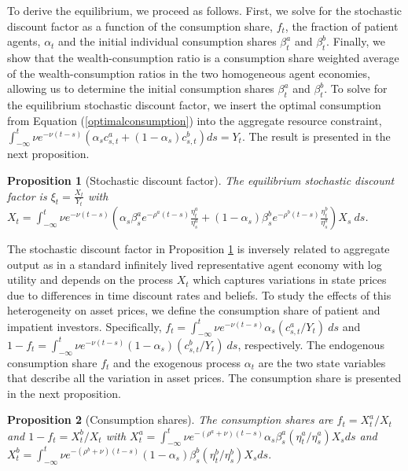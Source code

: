 \documentclass[preprint,11pt,authoryear]{elsarticle}
\theoremstyle{plain}
\newtheorem{prop}{Proposition}
\begin{document}
To derive the equilibrium, we proceed as follows. First, we solve for the stochastic discount factor as a function of the consumption share, $f_t$, the fraction of patient agents, $\alpha_t$ and the initial individual consumption shares $\beta^a_{t}$ and $\beta^b_{t}$. Finally, we show that the wealth-consumption ratio is a consumption share weighted average of the wealth-consumption ratios in the two homogeneous agent economies, allowing us to determine the initial consumption shares $\beta^a_{t}$ and $\beta^b_{t}$.  To solve for the  equilibrium stochastic discount factor, we insert the optimal consumption from Equation (\ref{optimalconsumption}) into the aggregate resource constraint, $\int_{-\infty}^{t} \nu e^{-\nu (t-s )} (\alpha_s c^a_{s,t}+(1-\alpha_s) c^b_{s,t}) ds =  Y_t$. The result is presented in the next proposition.
\begin{prop}[Stochastic discount factor]\label{SDF}
The equilibrium stochastic discount factor is $\xi_t = \frac{X_t}{Y_t}$ with $X_t =\int_{-\infty}^{t} \nu e^{-\nu \left(t-s\right)} \left(\alpha_s \beta^a_s e^{-\rho^a \left(t-s\right)}\frac{\eta^a_t}{\eta^a_s} +\left(1-\alpha_s\right)\beta^b_s e^{-\rho^b \left(t-s\right)} \frac{\eta^b_t}{\eta^b_s}\right)X_s \: ds$.
\end{prop}
The stochastic discount factor in Proposition \ref{SDF} is inversely related to aggregate output as in a standard infinitely lived representative agent economy with log utility and depends on the process $X_t$ which captures variations in state prices due to differences in time discount rates and beliefs. To study the effects of this heterogeneity on asset prices, we define the consumption share of patient and impatient investors. Specifically, $f_t  = \int_{-\infty}^t \nu  e^{-\nu(t-s)}  \alpha_s (c_{s,t}^a/Y_t) \: ds$ and $1-f_t  = \int_{-\infty}^t \nu  e^{-\nu(t-s)}  (1-\alpha_s) (c_{s,t}^b/ Y_t) \: ds$, respectively.  
The endogenous consumption share $f_t$ and the exogenous process $\alpha_t$ are the two state variables that describe all the variation in asset prices.  The consumption share is presented in the next proposition. 
\begin{prop}[Consumption shares]\label{prop:f}
The consumption shares are $f_t = X^a_t/X_t$ and $1-f_t = X^b_t/X_t$ with $X^a_t = \int_{-\infty}^{t} \nu e^{-\left(\rho^a + \nu\right)\left(t-s\right)}\alpha_s \beta^a_s (\eta^a_t/\eta^a_s)X_s ds$ and $X^b_t = \int_{-\infty}^{t} \nu e^{-\left(\rho^b + \nu\right)\left(t-s\right)}\left(1-\alpha_s\right) \beta^b_s (\eta^b_t/\eta^b_s)X_s ds.$
\end{prop}
\end{document}
